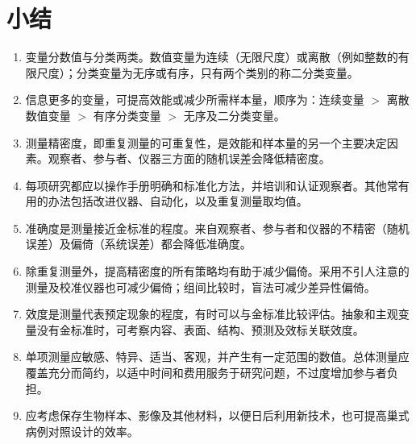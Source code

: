 \section{小结}
\begin{enumerate}
\item 变量分数值与分类两类。数值变量为连续（无限尺度）或离散（例如整数的有限尺度）；分类变量为无序或有序，只有两个类别的称二分类变量。
\item 信息更多的变量，可提高效能或减少所需样本量，顺序为：连续变量 $>$ 离散数值变量 $>$ 有序分类变量 $>$ 无序及二分类变量。
\item 测量精密度，即重复测量的可重复性，是效能和样本量的另一个主要决定因素。观察者、参与者、仪器三方面的随机误差会降低精密度。
\item 每项研究都应以操作手册明确和标准化方法，并培训和认证观察者。其他常有用的办法包括改进仪器、自动化，以及重复测量取均值。
\item 准确度是测量接近金标准的程度。来自观察者、参与者和仪器的不精密（随机误差）及偏倚（系统误差）都会降低准确度。
\item 除重复测量外，提高精密度的所有策略均有助于减少偏倚。采用不引人注意的测量及校准仪器也可减少偏倚；组间比较时，盲法可减少差异性偏倚。
\item 效度是测量代表预定现象的程度，有时可以与金标准比较评估。抽象和主观变量没有金标准时，可考察内容、表面、结构、预测及效标关联效度。
\item 单项测量应敏感、特异、适当、客观，并产生有一定范围的数值。总体测量应覆盖充分而简约，以适中时间和费用服务于研究问题，不过度增加参与者负担。
\item 应考虑保存生物样本、影像及其他材料，以便日后利用新技术，也可提高巢式病例对照设计的效率。
\end{enumerate}
